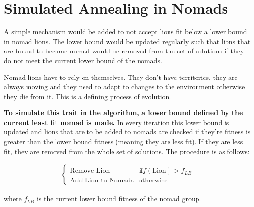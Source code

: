 \section{Simulated Annealing in Nomads}
\par A simple mechanism would be added to not accept lions fit below a lower bound in nomad lions. The lower bound would be updated regularly such that lions that are bound to become nomad would be removed from the set of solutions if they do not meet the current lower bound of the nomads.

\par Nomad lions have to rely on themselves. They don't have territories, they are always moving and they need to adapt to changes to the environment otherwise they die from it. This is a defining process of evolution.

\par \textbf{To simulate this trait in the algorithm, a lower bound defined by the current least fit nomad is made.} In every iteration this lower bound is updated and lions that are to be added to nomads are checked if they're fitness is greater than the lower bound fitness (meaning they are less fit). If they are less fit, they are removed from the whole set of solutions. The procedure is as follows:

\begin{align*}
\begin{cases}
   \text{Remove Lion}        & \text{if} f(\text{Lion})  > f_{LB} \\
   \text{Add Lion to Nomads}        & \text{otherwise}
\end{cases}
\end{align*}

where $f_{LB}$ is the current lower bound fitness of the nomad group.
